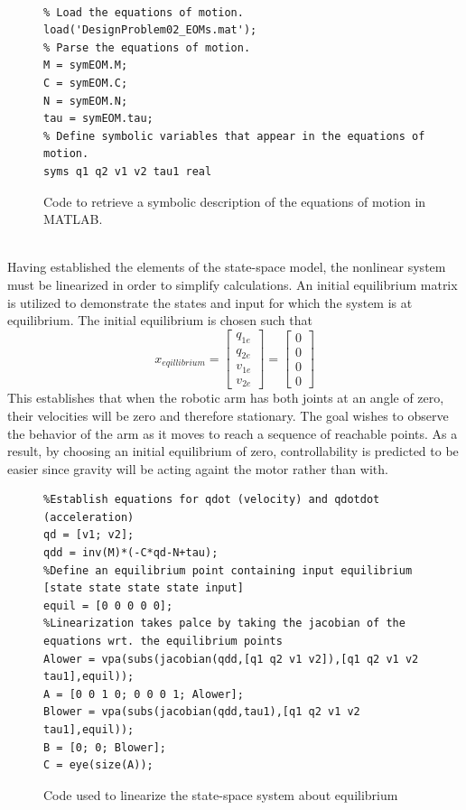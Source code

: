 \documentclass[12pt]{article}
\begin{document}
\\
\begin{figure}[h!]
\begin{lstlisting}
% Load the equations of motion.
load('DesignProblem02_EOMs.mat');
% Parse the equations of motion.
M = symEOM.M;
C = symEOM.C;
N = symEOM.N;
tau = symEOM.tau;
% Define symbolic variables that appear in the equations of motion.
syms q1 q2 v1 v2 tau1 real\end{lstlisting}
\caption{Code to retrieve a symbolic description of the equations of motion in MATLAB. \label{figCodeEOM}}
\end{figure}
\\
Having established the elements of the state-space model, the nonlinear system must be linearized in order to simplify calculations. An initial equilibrium matrix is utilized to demonstrate the states and input for which the system is at equilibrium. The initial equilibrium is chosen such that 
\begin{equation}
\label{equil}
x_{eqillibrium} = \begin{bmatrix}q_{1e}\\ q_{2e}\\ v_{1e}\\ v_{2e}\end{bmatrix} = \begin{bmatrix}0\\ 0\\ 0\\0\end{bmatrix} 
\end{equation}
This establishes that when the robotic arm has both joints at an angle of zero, their velocities will be zero and therefore stationary. The goal wishes to observe the behavior of the arm as it moves to reach a sequence of reachable points. As a result, by choosing an initial equilibrium of zero, controllability is predicted to be easier since gravity will be acting againt the motor rather than with.
\begin{figure}[h!]
\begin{lstlisting}
%Establish equations for qdot (velocity) and qdotdot (acceleration)
qd = [v1; v2];
qdd = inv(M)*(-C*qd-N+tau);
%Define an equilibrium point containing input equilibrium [state state state state input]
equil = [0 0 0 0 0];
%Linearization takes palce by taking the jacobian of the equations wrt. the equilibrium points
Alower = vpa(subs(jacobian(qdd,[q1 q2 v1 v2]),[q1 q2 v1 v2 tau1],equil));
A = [0 0 1 0; 0 0 0 1; Alower];
Blower = vpa(subs(jacobian(qdd,tau1),[q1 q2 v1 v2 tau1],equil));
B = [0; 0; Blower];
C = eye(size(A));
\end{lstlisting}
\caption{Code used to linearize the state-space system about equilibrium\label{figLinear}}
\end{figure}
\end{document}

